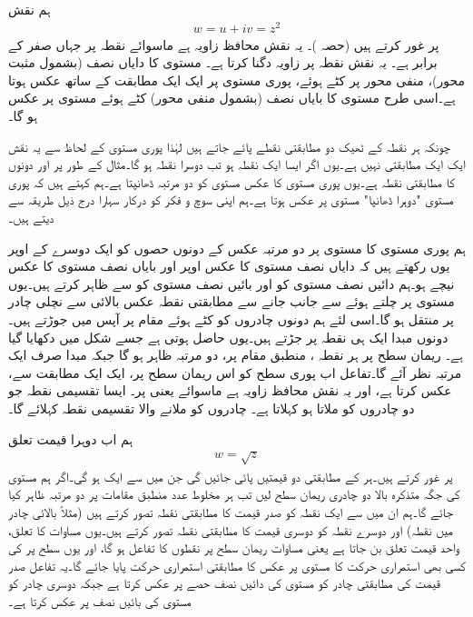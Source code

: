 ہم نقش 
\begin{align}
w=u+iv=z^2
\end{align}
پر غور کرتے ہیں (حصہ )۔ یہ نقش محافظ زاویہ ہے ماسوائے نقطہ  پر جہاں  صفر کے برابر ہے۔ یہ نقش نقطہ  پر  زاویہ دگنا کرتا ہے۔ مستوی کا دایاں نصف (بشمول مثبت  محور)، منفی  محور پر کٹے ہوئے،  پوری   مستوی پر ایک ایک مطابقت کے ساتھ عکس ہوتا ہے۔اسی طرح  مستوی کا بایاں نصف (بشمول منفی  محور) کٹے ہوئے  مستوی پر عکس ہو گا۔

چونکہ ہر  نقطہ کے ٹھیک دو مطابقتی  نقطے پائے جاتے ہیں لہٰذا  پوری  مستوی کے لحاظ سے یہ نقش ایک ایک مطابقتی نہیں ہے۔یوں اگر  ایسا ایک  نقطہ  ہو تب دوسرا نقطہ  ہو گا۔مثال کے طور پر  اور  دونوں کا مطابقتی نقطہ  ہے۔یوں پوری  مستوی کا عکس  مستوی کو دو مرتبہ ڈھانپتا ہے۔ہم کہتے ہیں کہ پوری  مستوی "دوہرا ڈھانپا"  مستوی پر عکس ہوتا ہے۔ہم اپنی سوچ و فکر کو درکار سہارا درج ذیل طریقہ سے دیتے ہیں۔

ہم پوری  مستوی کا  مستوی پر دو مرتبہ عکس کے دونوں حصوں کو ایک دوسرے کے اوپر یوں رکھتے ہیں کہ دایاں نصف  مستوی کا عکس اوپر اور بایاں  نصف  مستوی کا عکس نیچے ہو۔ہم  دائیں نصف  مستوی کو  اور بائیں نصف  مستوی کو  سے ظاہر کرتے ہیں۔یوں  مستوی پر چلتے ہوئے   سے  جانب جانے  سے مطابقتی نقطہ عکس بالائی سے نچلی چادر پر منتقل ہو گا۔اسی لئے ہم دونوں چادروں کو کٹے ہوئے مقام پر آپس میں جوڑتے ہیں۔دونوں مبدا ایک ہی نقطہ پر جڑتے ہیں۔یوں  حاصل ہوتی ہے جسے شکل میں دکھایا گیا ہے۔ ریمان سطح پر ہر نقطہ ، منطبق مقام پر، دو مرتبہ ظاہر ہو گا جبکہ مبدا صرف ایک مرتبہ نظر آئے گا۔تفاعل  اب پوری  سطح کو اس ریمان سطح پر،  ایک ایک مطابقت سے، عکس کرتا ہے، اور یہ نقش محافظ زاویہ ہے ماسوائے  یعنی   پر۔ ایسا تقسیمی نقطہ جو دو چادروں کو ملاتا ہو  کہلاتا ہے۔  چادروں کو ملانے والا تقسیمی نقطہ   کہلائے گا۔

ہم اب دوہرا قیمت تعلق
\begin{align}\label{مساوات_نقش_جذر_تفاعل_الف}
w=\sqrt{z}
\end{align} 
پر غور کرتے ہیں۔ہر  کے مطابقتی دو   قیمتیں پائی جائیں گی جن میں سے ایک  ہو گی۔اگر ہم  مستوی کی جگہ متذکرہ بالا دو چادری ریمان سطح  لیں تب ہر مخلوط عدد  منطبق مقامات پر دو مرتبہ ظاہر کیا جائے گا۔ہم ان میں سے ایک نقطہ کو صدر قیمت کا مطابقتی نقطہ  تصور کرتے ہیں (مثلاً بالائی چادر میں نقطہ) اور دوسرے نقطہ کو دوسری قیمت کا مطابقتی نقطہ تصور کرتے ہیں۔یوں مساوات  کا تعلق، واحد قیمت تعلق بن جاتا ہے یعنی مساوات  ریمان سطح پر نقطوں کا تفاعل ہو گا، اور یوں سطح پر  کی کسی بھی استمراری حرکت کا  مستوی پر عکس کا مطابقتی استمراری حرکت پایا جائے گا۔یہ تفاعل صدر قیمت کی مطابقتی چادر کو   مستوی کی دائیں نصف حصے پر  عکس کرتا ہے جبکہ دوسری چادر کو  مستوی کی بائیں نصف پر عکس کرتا ہے۔


